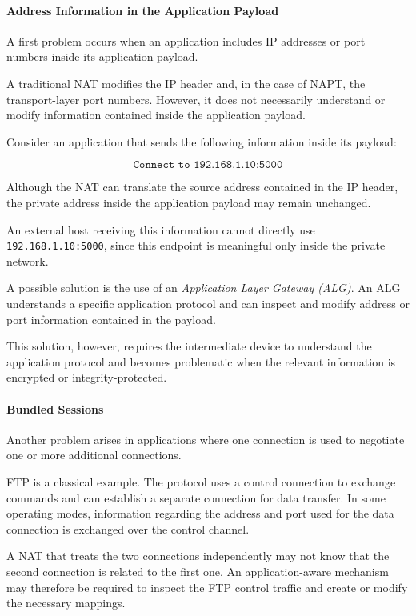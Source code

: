 \paragraph{Address Information in the Application Payload}
A first problem occurs when an application includes IP addresses or port numbers inside its application payload.

A traditional NAT modifies the IP header and, in the case of NAPT, the transport-layer port numbers. However, it does not necessarily understand or modify information contained inside the application payload.

\begin{example}
	Consider an application that sends the following information inside its payload:

	\[
		\texttt{Connect to 192.168.1.10:5000}
	\]

	Although the NAT can translate the source address contained in the IP header, the private address inside the application payload may remain unchanged.

	An external host receiving this information cannot directly use \texttt{192.168.1.10:5000}, since this endpoint is meaningful only inside the private network.
\end{example}

A possible solution is the use of an \textit{Application Layer Gateway (ALG)}. An ALG understands a specific application protocol and can inspect and modify address or port information contained in the payload.

This solution, however, requires the intermediate device to understand the application protocol and becomes problematic when the relevant information is encrypted or integrity-protected.

\paragraph{Bundled Sessions}

Another problem arises in applications where one connection is used to negotiate one or more additional connections.

FTP is a classical example. The protocol uses a control connection to exchange commands and can establish a separate connection for data transfer. In some operating modes, information regarding the address and port used for the data connection is exchanged over the control channel.

A NAT that treats the two connections independently may not know that the second connection is related to the first one. An application-aware mechanism may therefore be required to inspect the FTP control traffic and create or modify the necessary mappings.

